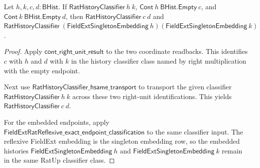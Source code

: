 \begin{theorem}
\label{thm:numfieldup-rat-reflexive-coordinate-exactness}
Let $h,k,c,d:\mathsf{BHist}$. If
$\mathsf{RatHistoryClassifier}\ h\ k$,
$\mathsf{Cont}\ h\ \mathsf{BHist.Empty}\ c$, and
$\mathsf{Cont}\ k\ \mathsf{BHist.Empty}\ d$, then
$\mathsf{RatHistoryClassifier}\ c\ d$ and
$\mathsf{RatHistoryClassifier}\ (\mathsf{FieldExtSingletonEmbedding}\ h)
(\mathsf{FieldExtSingletonEmbedding}\ k)$.
\end{theorem}
\begin{proof}
Apply $\mathsf{cont\_right\_unit\_result}$ to the two coordinate readbacks. This
identifies $c$ with $h$ and $d$ with $k$ in the history classifier class named by
right multiplication with the empty endpoint.

Next use $\mathsf{RatHistoryClassifier\_hsame\_transport}$ to transport the
given classifier $\mathsf{RatHistoryClassifier}\ h\ k$ across these two
right-unit identifications. This yields
$\mathsf{RatHistoryClassifier}\ c\ d$.

For the embedded endpoints, apply
$\mathsf{FieldExtRatReflexive\_exact\_endpoint\_classification}$ to the same
classifier input. The reflexive FieldExt embedding is the singleton embedding
row, so the embedded histories
$\mathsf{FieldExtSingletonEmbedding}\ h$ and
$\mathsf{FieldExtSingletonEmbedding}\ k$ remain in the same RatUp classifier
class.
\end{proof}


